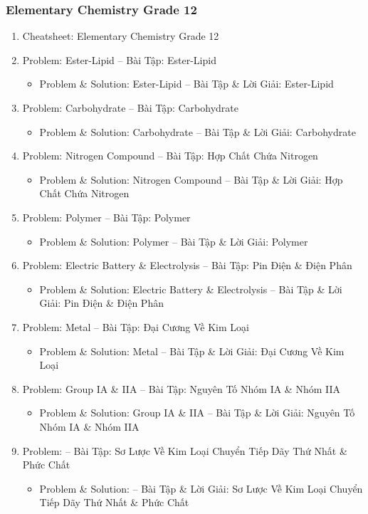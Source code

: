 \documentclass[12pt,oneside]{book}
\begin{document}
\subsubsection{Elementary Chemistry Grade 12}

\begin{enumerate}
	\item Cheatsheet: Elementary Chemistry Grade 12
	\item Problem: Ester-Lipid -- Bài Tập: Ester-Lipid
	\begin{itemize}
		\item Problem \& Solution: Ester-Lipid -- Bài Tập \& Lời Giải: Ester-Lipid
	\end{itemize}
	\item Problem: Carbohydrate -- Bài Tập: Carbohydrate
	\begin{itemize}
		\item Problem \& Solution: Carbohydrate -- Bài Tập \& Lời Giải: Carbohydrate
	\end{itemize}
	\item Problem: Nitrogen Compound -- Bài Tập: Hợp Chất Chứa Nitrogen
	\begin{itemize}
		\item Problem \& Solution: Nitrogen Compound -- Bài Tập \& Lời Giải: Hợp Chất Chứa Nitrogen
	\end{itemize}
	\item Problem: Polymer -- Bài Tập: Polymer
	\begin{itemize}
		\item Problem \& Solution: Polymer -- Bài Tập \& Lời Giải: Polymer
	\end{itemize}
	\item Problem: Electric Battery \& Electrolysis -- Bài Tập: Pin Điện \& Điện Phân
	\begin{itemize}
		\item Problem \& Solution: Electric Battery \& Electrolysis -- Bài Tập \& Lời Giải: Pin Điện \& Điện Phân
	\end{itemize}
	\item Problem: Metal -- Bài Tập: Đại Cương Về Kim Loại
	\begin{itemize}
		\item Problem \& Solution: Metal -- Bài Tập \& Lời Giải: Đại Cương Về Kim Loại
	\end{itemize}
	\item Problem: Group IA \& IIA -- Bài Tập: Nguyên Tố Nhóm IA \& Nhóm IIA
	\begin{itemize}
		\item Problem \& Solution: Group IA \& IIA -- Bài Tập \& Lời Giải: Nguyên Tố Nhóm IA \& Nhóm IIA
	\end{itemize}
	\item Problem: -- Bài Tập: Sơ Lược Về Kim Loại Chuyển Tiếp Dãy Thứ Nhất \& Phức Chất
	\begin{itemize}
		\item Problem \& Solution: -- Bài Tập \& Lời Giải: Sơ Lược Về Kim Loại Chuyển Tiếp Dãy Thứ Nhất \& Phức Chất
	\end{itemize}
\end{enumerate}
\end{document}
